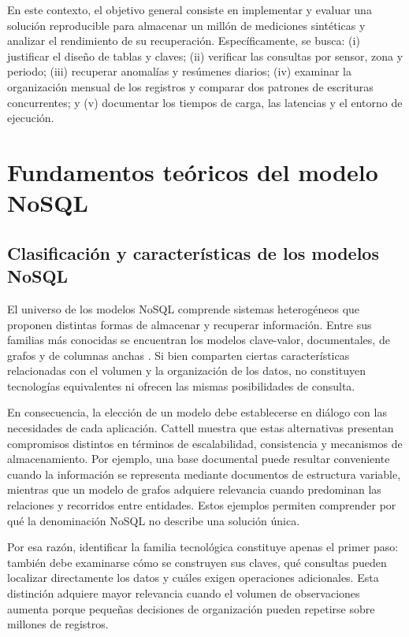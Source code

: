 \documentclass[conference]{IEEEtran}
\begin{document}
En este contexto, el objetivo general consiste en implementar y evaluar una solución reproducible para almacenar un millón de mediciones sintéticas y analizar el rendimiento de su recuperación. Específicamente, se busca: (i) justificar el diseño de tablas y claves; (ii) verificar las consultas por sensor, zona y periodo; (iii) recuperar anomalías y resúmenes diarios; (iv) examinar la organización mensual de los registros y comparar dos patrones de escrituras concurrentes; y (v) documentar los tiempos de carga, las latencias y el entorno de ejecución.

\section{Fundamentos teóricos del modelo NoSQL}

\subsection{Clasificación y características de los modelos NoSQL}

El universo de los modelos NoSQL comprende sistemas heterogéneos que proponen distintas formas de almacenar y recuperar información. Entre sus familias más conocidas se encuentran los modelos clave-valor, documentales, de grafos y de columnas anchas \cite{han2011}. Si bien comparten ciertas características relacionadas con el volumen y la organización de los datos, no constituyen tecnologías equivalentes ni ofrecen las mismas posibilidades de consulta.

En consecuencia, la elección de un modelo debe establecerse en diálogo con las necesidades de cada aplicación. Cattell \cite{cattell11} muestra que estas alternativas presentan compromisos distintos en términos de escalabilidad, consistencia y mecanismos de almacenamiento. Por ejemplo, una base documental puede resultar conveniente cuando la información se representa mediante documentos de estructura variable, mientras que un modelo de grafos adquiere relevancia cuando predominan las relaciones y recorridos entre entidades. Estos ejemplos permiten comprender por qué la denominación NoSQL no describe una solución única.

Por esa razón, identificar la familia tecnológica constituye apenas el primer paso: también debe examinarse cómo se construyen sus claves, qué consultas pueden localizar directamente los datos y cuáles exigen operaciones adicionales. Esta distinción adquiere mayor relevancia cuando el volumen de observaciones aumenta porque pequeñas decisiones de organización pueden repetirse sobre millones de registros.
\end{document}
